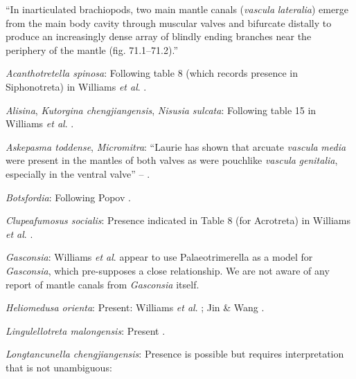 \documentclass[openany]{book}
\theoremstyle{definition}
\theoremstyle{definition}
\theoremstyle{definition}
\theoremstyle{remark}
\begin{document}
``In inarticulated brachiopods, two main mantle canals (\emph{vascula}
\emph{lateralia}) emerge from the main body cavity through muscular
valves and bifurcate distally to produce an increasingly dense array of
blindly ending branches near the periphery of the mantle (fig.
71.1--71.2).''

\hypertarget{Acanthotretella_spinosa-coding-35}{}
\emph{Acanthotretella spinosa}: Following table 8 (which records
presence in Siphonotreta) in Williams \emph{et al}.
\citeyearpar{Williams2000LinguliformeaCraniiformea}.

\hypertarget{Alisina-coding-35}{}
\emph{Alisina}, \emph{Kutorgina chengjiangensis}, \emph{Nisusia
sulcata}: Following table 15 in Williams \emph{et al}.
\citeyearpar{Williams2000LinguliformeaCraniiformea}.

\hypertarget{Askepasma_toddense-coding-35}{}
\emph{Askepasma toddense}, \emph{Micromitra}: ``Laurie
\citeyearpar{Laurie1987Themusculature} has shown that arcuate
\emph{vascula} \emph{media} were present in the mantles of both valves
as were pouchlike \emph{vascula} \emph{genitalia}, especially in the
ventral valve'' -- \citet{Williams1997Introduction}.

\hypertarget{Botsfordia-coding-35}{}
\emph{Botsfordia}: Following Popov \citeyearpar{Popov1992TheCambrian}.

\hypertarget{Clupeafumosus_socialis-coding-35}{}
\emph{Clupeafumosus socialis}: Presence indicated in Table 8 (for
Acrotreta) in Williams \emph{et al}.
\citeyearpar{Williams2000LinguliformeaCraniiformea}.

\hypertarget{Gasconsia-coding-35}{}
\emph{Gasconsia}: Williams \emph{et al}. \citeyearpar[table
15]{Williams2000LinguliformeaCraniiformea} appear to use
Palaeotrimerella \citep[as drawn in][]{Williams1997Introduction} as a
model for \emph{Gasconsia}, which pre-supposes a close relationship. We
are not aware of any report of mantle canals from \emph{Gasconsia}
itself.

\hypertarget{Heliomedusa_orienta-coding-35}{}
\emph{Heliomedusa orienta}: Present: Williams \emph{et al}.
\citeyearpar{Williams2000LinguliformeaCraniiformea}; Jin \& Wang
\citeyearpar{Jin1992Revisionof}.

\hypertarget{Lingulellotreta_malongensis-coding-35}{}
\emph{Lingulellotreta malongensis}: Present
\citep{Williams2000LinguliformeaCraniiformea}.

\hypertarget{Longtancunella_chengjiangensis-coding-35}{}
\emph{Longtancunella chengjiangensis}: Presence is possible but requires
interpretation that is not unambiguous:
\end{document}
